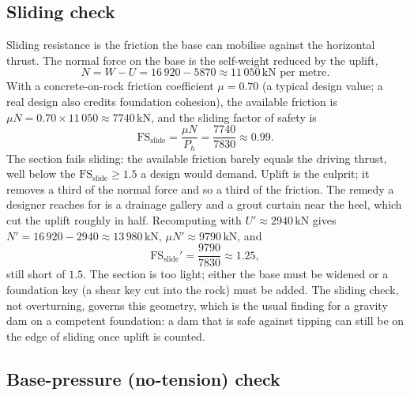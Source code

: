 \subsection{Sliding check}

Sliding resistance is the friction the base can mobilise against the
horizontal thrust. The normal force on the base is the self-weight
reduced by the uplift,
\[
N = W - U = 16\,920 - 5870 \approx 11\,050\,\text{kN per metre}.
\]
With a concrete-on-rock friction coefficient $\mu = 0.70$ (a typical
design value; a real design also credits foundation cohesion), the
available friction is $\mu N = 0.70 \times 11\,050 \approx 7740\,\text{
kN}$, and the sliding factor of safety is
\[
\mathrm{FS}_{\text{slide}} = \frac{\mu N}{P_h}
= \frac{7740}{7830}
\approx 0.99.
\]
The section fails sliding: the available friction barely equals the
driving thrust, well below the $\mathrm{FS}_{\text{slide}} \ge 1.5$ a
design would demand. Uplift is the culprit; it removes a third of the
normal force and so a third of the friction. The remedy a designer
reaches for is a drainage gallery and a grout curtain near the heel,
which cut the uplift roughly in half. Recomputing with $U' \approx
2940\,\text{kN}$ gives $N' = 16\,920 - 2940 \approx 13\,980\,\text{kN}$,
$\mu N' \approx 9790\,\text{kN}$, and
\[
\mathrm{FS}_{\text{slide}}' = \frac{9790}{7830} \approx 1.25,
\]
still short of $1.5$. The section is too light; either the base must be
widened or a foundation key (a shear key cut into the rock) must be
added. The sliding check, not overturning, governs this geometry, which
is the usual finding for a gravity dam on a competent foundation: a dam
that is safe against tipping can still be on the edge of sliding once
uplift is counted.

\subsection{Base-pressure (no-tension) check}

